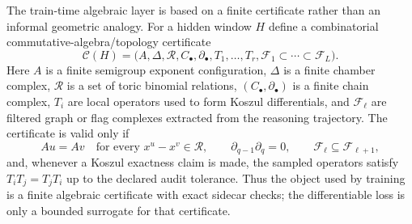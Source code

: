 \documentclass[11pt]{article}
\theoremstyle{definition}
\theoremstyle{plain}
\theoremstyle{remark}
\numberwithin{equation}{section}
\begin{document}
The train-time algebraic layer is based on a finite certificate rather than an informal geometric analogy.  For a hidden window $H$ define a combinatorial commutative-algebra/topology certificate
\begin{equation}
  \mathcal C(H)=
  \bigl(A,\Delta,\mathcal R,C_\bullet,\partial_\bullet,
        T_1,\ldots,T_r,\mathcal F_1\subset\cdots\subset\mathcal F_L\bigr).
\end{equation}
Here $A$ is a finite semigroup exponent configuration, $\Delta$ is a finite chamber complex, $\mathcal R$ is a set of toric binomial relations, $(C_\bullet,\partial_\bullet)$ is a finite chain complex, $T_i$ are local operators used to form Koszul differentials, and $\mathcal F_\ell$ are filtered graph or flag complexes extracted from the reasoning trajectory.  The certificate is valid only if
\begin{equation}
  A u=A v\quad\text{for every }x^u-x^v\in\mathcal R,\qquad
  \partial_{q-1}\partial_q=0,\qquad
  \mathcal F_\ell\subseteq \mathcal F_{\ell+1},
\end{equation}
and, whenever a Koszul exactness claim is made, the sampled operators satisfy $T_iT_j=T_jT_i$ up to the declared audit tolerance.  Thus the object used by training is a finite algebraic certificate with exact sidecar checks; the differentiable loss is only a bounded surrogate for that certificate.
\end{document}
